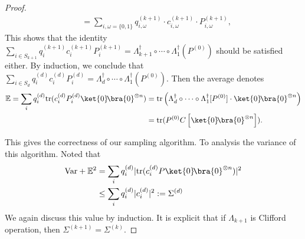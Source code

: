 \documentclass[aps,%
twocolumn,%
floatfix,%
pra,%
amsfonts,%
longbibliography,%
groupedaddress,%
superscriptaddress]{revtex4-2}%
\newcommand{\1}{\mathbbm{1}}
\begin{document}
\begin{proof}
\begin{align}
        &=\sum_{i,\omega=\{0,1\}} q_{i,\omega}^{(k+1)} \cdot c_{i,\omega}^{(k+1)}  \cdot P_{i,\omega}^{(k+1)},
    \end{align}
    This shows  that the identity  $\sum_{i \in S_{k+1}} q_i^{(k+1)} c_i^{(k+1)}P_i^{(k+1)} = \Lambda_{k+1}^\dagger \circ \cdots\circ\Lambda_1^\dagger(P^{(0)})$ should be satisfied either. 
    By induction, we conclude that $\sum_{i \in S_{d}} q_i^{(d)} c_i^{(d)}P_i^{(d)} = \Lambda_d^\dagger \circ \cdots\circ\Lambda_1^\dagger(P^{(0)})$. 
    Then the average denotes
    \begin{align}
        \mathbb{E} = \sum_{i} q_i^{(d)}\text{tr}(c_i^{(d)}P_i^{(d)} \ket{0}\!\bra{0}^{\otimes n}) &=  \text{tr}\left(\Lambda_d^\dagger \circ \cdots\circ\Lambda_1^\dagger[P^{(0)}] \cdot\ket{0}\!\bra{0}^{\otimes n}\right)\\
        &=\text{tr}( P^{(0)} C\left[\ket{0}\!\bra{0}^{\otimes n}\right] ).
    \end{align}
    
This gives the correctness of our sampling algorithm. 
To analysis the variance of this algorithm. Noted that 
    \begin{align}
        \text{Var} + \mathbb{E}^2 &= \sum_{i} q_i^{(d)}|\text{tr}(c_i^{(d)}P \ket{0}\!\bra{0}^{\otimes n})|^2\\
        &\leq  \sum_{i} q_i^{(d)}|c_i^{(d)}|^2 := \Sigma^{(d)}
    \end{align}
    We again discuss this value by induction. It is explicit that if $\Lambda_{k+1}$ is Clifford operation, then $\Sigma^{(k + 1)} = \Sigma^{(k)}$.
    

\end{proof}
\end{document}
